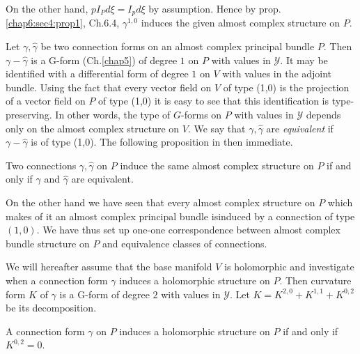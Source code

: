 On the other hand, $pI_P  d \xi = I_p d \xi$ by assumption. Hence by
prop.\ref{chap6:sec4:prop1}, Ch.6.4, $\gamma^{1, 0}$ induces the given
almost complex structure on $P$. 

Let $\gamma, \hat{\gamma}$ be two connection forms on an almost
complex principal bundle $P$. Then $\gamma - \hat{\gamma}$ is a G-form
(Ch.\ref{chap5}) of degree $1$ on $P$ with values in $\mathscr{Y}$. It may be
identified with a differential form of degree $1$ on $V$ with values
in the adjoint bundle. Using the fact that every vector field on $V$
of type (1,0) is the projection of a vector field on $P$ of type
(1,0) it is easy to see that this identification is
type-preserving. In other words, the type of $G$-forms on $P$ with
values in $\mathscr{Y}$ depends only on the almost complex structure
on $V$. We say that $\gamma , \hat{\gamma}$ are \textit{equivalent} if
$\gamma - \hat{\gamma}$ is of type (1,0). The following proposition
in then immediate. 

\begin{proposition}\label{chap6:sec4:prop2}%
  Two connections $\gamma , \hat{\gamma}$ on $P$ induce the same
  almost complex structure on $P$ if and only if $\gamma$ and
  $\hat{\gamma}$ are equivalent. 
\end{proposition}

On the other hand we have seen that every almost complex structure on
$P$ which makes of it an almost complex principal bundle is\pageoriginale induced by
a connection of type $(1, 0)$. We have thus set up one-one
correspondence between almost complex bundle structure on $P$ and
equivalence classes of connections. 

We will hereafter assume that the base manifold $V$ is holomorphic and
investigate when a connection form $\gamma$ induces a holomorphic
structure on $P$. Then curvature form $K$ of $\gamma$ is a G-form of
degree $2$ with values in $\mathscr{Y}$. Let $K = K^{2, 0} + K^{1, 1}
+ K^{0, 2}$ be its decomposition. 

\begin{proposition}\label{chap6:sec4:prop3}%
  A connection form $\gamma$ on $P$ induces a holomorphic structure on
  $P$ if and only if $K^{0, 2}= 0$. 
\end{proposition}

